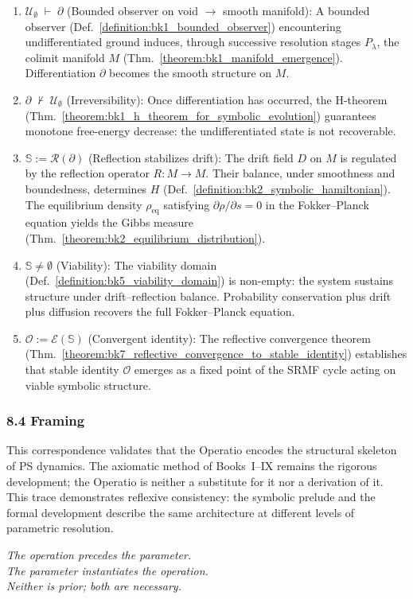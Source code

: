 \begin{enumerate}
\item \textbf{$\mathcal{U}_{\emptyset} \;\vdash\; \partial$}
(Bounded observer on void $\to$ smooth manifold):
A bounded observer
(Def.~\ref{definition:bk1_bounded_observer}) encountering undifferentiated
ground induces, through successive resolution stages $P_\lambda$, the
colimit manifold $M$ (Thm.~\ref{theorem:bk1_manifold_emergence}).
Differentiation $\partial$ becomes the smooth structure on $M$.

\item \textbf{$\partial \;\nvdash\; \mathcal{U}_{\emptyset}$}
(Irreversibility):
Once differentiation has occurred, the H-theorem
(Thm.~\ref{theorem:bk1_h_theorem_for_symbolic_evolution}) guarantees
monotone free-energy decrease: the undifferentiated state is not recoverable.

\item \textbf{$\mathbb{S} := \mathcal{R}(\partial)$}
(Reflection stabilizes drift):
The drift field $D$ on $M$ is regulated by the reflection operator $R: M \to M$.
Their balance, under smoothness and boundedness, determines $H$
(Def.~\ref{definition:bk2_symbolic_hamiltonian}). The equilibrium density
$\rho_{\mathrm{eq}}$ satisfying $\partial \rho / \partial s = 0$ in the
Fokker--Planck equation yields the Gibbs measure
(Thm.~\ref{theorem:bk2_equilibrium_distribution}).

\item \textbf{$\mathbb{S} \neq \emptyset$}
(Viability):
The viability domain
(Def.~\ref{definition:bk5_viability_domain}) is non-empty: the system
sustains structure under drift--reflection balance. Probability conservation
plus drift plus diffusion recovers the full Fokker--Planck equation.

\item \textbf{$\mathcal{O} := \mathcal{E}(\mathbb{S})$}
(Convergent identity):
The reflective convergence theorem
(Thm.~\ref{theorem:bk7_reflective_convergence_to_stable_identity})
establishes that stable identity $\mathcal{O}$ emerges as a fixed point
of the SRMF cycle acting on viable symbolic structure.
\end{enumerate}

\subsubsection*{8.4 Framing}

This correspondence validates that the Operatio encodes the structural skeleton
of PS dynamics. The axiomatic method of Books~I--IX remains the rigorous
development; the Operatio is neither a substitute for it nor a derivation of it.
This trace demonstrates reflexive consistency: the symbolic prelude and the
formal development describe the same architecture at different levels of
parametric resolution.

\begin{flushright}
\emph{The operation precedes the parameter.\\
The parameter instantiates the operation.\\
Neither is prior; both are necessary.}
\end{flushright}
